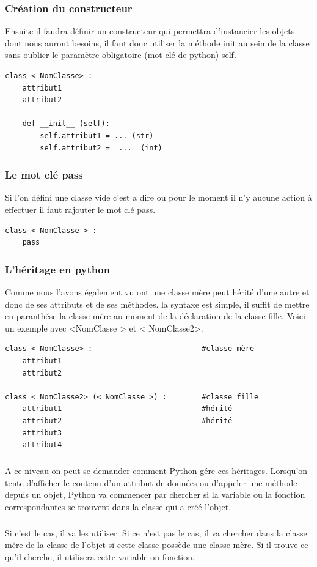 \documentclass[a4paper, 12pt, twoside]{article}
\begin{document}
{{{\subsubsection{Création du constructeur}{Ensuite il faudra définir un constructeur qui permettra d'instancier les objets dont nous auront besoins, il faut donc utiliser la méthode  \textsf{init} au sein de la classe sans oublier le paramètre obligatoire (mot clé de python) \textsf{self}. }

\begin{verbatim}
class < NomClasse> : 
    attribut1
    attribut2 

    def __init__ (self):
        self.attribut1 = ... (str)
        self.attribut2 =  ...  (int)
\end{verbatim}

\subsubsection{Le mot clé pass}{Si l'on défini une classe vide c'est a dire ou pour le moment il n'y aucune action à effectuer il faut rajouter le mot clé \textsf{pass}.}
\begin{verbatim}
class < NomClasse > : 
    pass 
\end{verbatim}
\subsubsection{L'héritage en python}{Comme nous l'avons également vu ont une classe mère peut hérité d'une autre et donc de ses attributs et de ses méthodes. la syntaxe est simple, il suffit de mettre en paranthése la classe mère au moment de la déclaration de la classe fille. Voici un exemple avec <NomClasse > et < NomClasse2>.}
\begin{verbatim}
class < NomClasse> :                         #classe mère
    attribut1
    attribut2 

class < NomClasse2> (< NomClasse >) :        #classe fille
    attribut1                                #hérité 
    attribut2                                #hérité 
    attribut3   
    attribut4
\end{verbatim}
\subparagraph{}{A ce niveau on peut se demander comment Python gére ces héritages. Lorsqu’on tente d’afficher le contenu d’un attribut de données ou d’appeler une méthode depuis un objet, Python va commencer par chercher si la variable ou la fonction correspondantes se trouvent dans la classe qui a créé l’objet.}

\subparagraph{}{Si c’est le cas, il va les utiliser. Si ce n’est pas le cas, il va chercher dans la classe mère de la classe de l’objet si cette classe possède une classe mère. Si il trouve ce qu’il cherche, il utilisera cette variable ou fonction.}

}}}
\end{document}
